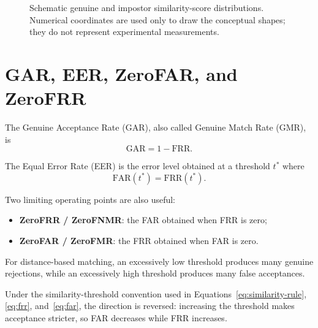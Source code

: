 \documentclass[11pt,a4paper,oneside]{report}
\begin{document}
\begin{figure}[htbp]
\else


\fi

\caption{
Schematic genuine and impostor similarity-score distributions.
Numerical coordinates are used only to draw the conceptual shapes;
they do not represent experimental measurements.
}
\label{fig:score-distributions}

\end{figure}

\section{GAR, EER, ZeroFAR, and ZeroFRR}
\label{subsec:eer}

The Genuine Acceptance Rate (GAR), also called Genuine Match Rate (GMR),
is
\begin{equation}
\mathrm{GAR}
=
1-\mathrm{FRR}.
\label{eq:gar}
\end{equation}

The Equal Error Rate (EER) is the error level obtained at a threshold
\(t^\ast\) where
\begin{equation}
\mathrm{FAR}(t^\ast)
=
\mathrm{FRR}(t^\ast).
\label{eq:eer}
\end{equation}

Two limiting operating points are also useful:

\begin{itemize}
    \item \textbf{ZeroFRR / ZeroFNMR}:
    the FAR obtained when FRR is zero;

    \item \textbf{ZeroFAR / ZeroFMR}:
    the FRR obtained when FAR is zero.
\end{itemize}

For distance-based matching, an excessively low threshold produces many
genuine rejections, while an excessively high threshold produces many
false acceptances.

Under the similarity-threshold convention used in
Equations~\eqref{eq:similarity-rule},
\eqref{eq:frr},
and~\eqref{eq:far},
the direction is reversed:
increasing the threshold makes acceptance stricter,
so FAR decreases while FRR increases.
\end{document}
